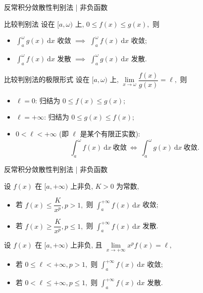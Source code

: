 \begin{frame}{反常积分敛散性判别法 | 非负函数}

\begin{block}{比较判别法}
设在 $[a, \omega)$ 上, $0 \leqslant f(x) \leqslant g(x),$ 则
\begin{itemize}[<+->]
\item $\int_a^\omega g(x) ~ \mathrm{d} x $ 收敛 $\implies$ $\int_a^\omega f(x) ~ \mathrm{d} x $ 收敛;
\item $\int_a^\omega f(x) ~ \mathrm{d} x $ 发散 $\implies$ $\int_a^\omega g(x) ~ \mathrm{d} x $ 发散.
\end{itemize}
\end{block}

\pause

\begin{block}{比较判别法的极限形式}
设在 $[a, \omega)$ 上, $\lim\limits_{x \to \omega} \dfrac{f(x)}{g(x)} = \ell,$ 则
\begin{itemize}[<+->]
\item $\ell = 0$:
归结为 $0 \leqslant f(x) \leqslant g(x);$
\item $\ell = +\infty$:
归结为 $0 \leqslant g(x) \leqslant f(x);$
\item $0 < \ell < +\infty$ (即 $\ell$ 是某个有限正实数):
\vspace{-0.5em}
\[\int_a^\omega f(x) ~ \mathrm{d} x ~ \text{收敛} ~ \Longleftrightarrow ~ \int_a^\omega g(x) ~ \mathrm{d} x ~ \text{收敛}.\]
\end{itemize}
\end{block}

\end{frame}


\begin{frame}{反常积分敛散性判别法 | 非负函数}

\begin{thm}
设 $f(x)$ 在 $[a, +\infty)$ 上非负, $K > 0$ 为常数,
\begin{itemize}
\item 若 $f(x) \leqslant \dfrac{K}{x^p}, p > 1,$ 则 $\int_a^{+\infty} f(x) ~ \mathrm{d} x $ 收敛;
\item 若 $f(x) \geqslant \dfrac{K}{x^p}, p \leqslant 1,$ 则 $\int_a^{+\infty} f(x) ~ \mathrm{d} x $ 发散.
\end{itemize}
\end{thm}

\pause

\begin{thm}
设 $f(x)$ 在 $[a, +\infty)$ 上非负, 且 $\lim\limits_{x \to +\infty} x^p f(x) = \ell,$
\begin{itemize}
\item 若 $0 \leqslant \ell < +\infty, p > 1,$ 则 $\int_a^{+\infty} f(x) ~ \mathrm{d} x $ 收敛;
\item 若 $0 < \ell \leqslant +\infty, p \leqslant 1,$ 则 $\int_a^{+\infty} f(x) ~ \mathrm{d} x $ 发散.
\end{itemize}
\end{thm}

\end{frame}

